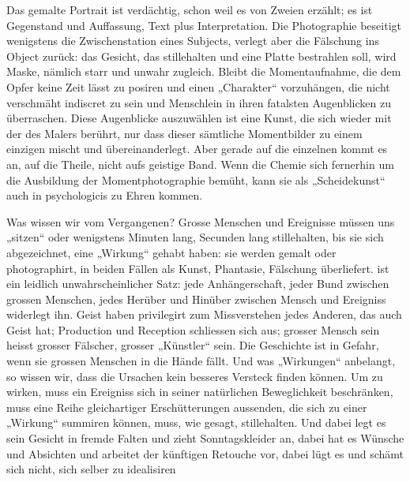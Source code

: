  Das gemalte Portrait ist verdächtig, schon weil es von Zweien erzählt; es ist Gegenstand und Auffassung, Text plus Interpretation. Die Photographie beseitigt wenigstens die Zwischenstation eines Subjects, verlegt aber die Fälschung ins Object zurück: das Gesicht, das stillehalten und eine Platte bestrahlen soll, wird Maske, nämlich starr und unwahr zugleich. Bleibt die Momentaufnahme, die dem Opfer keine Zeit lässt zu posiren und einen „Charakter“ vorzuhängen, die nicht verschmäht indiscret zu sein und Menschlein in ihren fatalsten Augenblicken zu überraschen. Diese Augenblicke auszuwählen ist eine Kunst, die sich wieder mit der des Malers berührt, nur dass dieser sämtliche Momentbilder zu einem einzigen mischt und übereinanderlegt. Aber gerade auf die einzelnen kommt es an, auf die Theile, nicht aufs geistige Band. Wenn die Chemie sich fernerhin um die Ausbildung der Momentphotographie bemüht, kann sie als „Scheidekunst“ auch in psychologicis zu Ehren kommen.
\par

Was wissen wir vom Vergangenen? Grosse Menschen und Ereignisse müssen uns „sitzen“ oder wenigstens Minuten lang, Secunden lang stillehalten, bis sie sich abgezeichnet, eine „Wirkung“ gehabt haben: sie werden gemalt oder photographirt, in beiden Fällen als Kunst, Phantasie, Fälschung überliefert.  ist ein leidlich unwahrscheinlicher Satz: jede Anhängerschaft, jeder Bund zwischen grossen Menschen, jedes Herüber und Hinüber zwischen Mensch und Ereigniss widerlegt ihn. Geist haben privilegirt zum Missverstehen jedes Anderen, das auch Geist hat; Production und Reception schliessen sich aus; grosser Mensch sein heisst grosser Fälscher, grosser „Künstler“ sein. Die Geschichte ist in Gefahr, wenn sie grossen Menschen in die Hände fällt. Und was „Wirkungen“ anbelangt, so wissen wir, dass die Ursachen kein besseres Versteck finden können. Um zu wirken, muss ein Ereigniss sich in seiner natürlichen Beweglichkeit beschränken, muss eine Reihe gleichartiger Erschütterungen aussenden, die sich zu einer „Wirkung“ summiren können, muss, wie gesagt, stillehalten. Und dabei legt es sein Gesicht in fremde Falten und zieht Sonntagskleider an, dabei hat es Wünsche und Absichten und arbeitet der künftigen Retouche vor, dabei lügt es und schämt sich nicht, sich selber zu idealisiren 
\par


